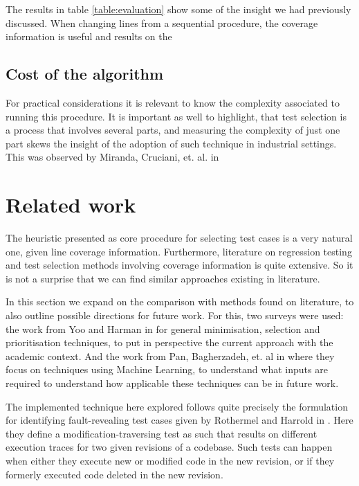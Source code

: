 \documentclass{article}
\begin{document}
The results in table \ref{table:evaluation} show some of the insight we had previously discussed. When changing lines from a sequential procedure, the coverage information is useful and results on the 


\subsection{Cost of the algorithm}
For practical considerations it is relevant to know the complexity associated to running this procedure. It is important as well to highlight, that test selection is a process that involves several parts, and measuring the complexity of just one part skews the insight of the adoption of such technique in industrial settings. This was observed by Miranda, Cruciani, et. al. in \cite{TODO}
\section{Related work}\label{section:alg-and-context}
The heuristic presented as core procedure for selecting test cases is a very natural one, given line coverage information. Furthermore, literature on regression testing and test selection methods involving coverage information is quite extensive. So it is not a surprise that we can find similar approaches existing in literature.

In this section we expand on the comparison with methods found on literature, to also outline possible directions for future work. For this, two surveys were used: the work from Yoo and Harman in \cite{Yoo2009RegressionTM} for general minimisation, selection and prioritisation techniques, to put in perspective the current approach with the academic context. And the work from Pan, Bagherzadeh, et. al in \cite{Pan2021TestCS} where they focus on techniques using Machine Learning, to understand what inputs are required to understand how applicable these techniques can be in future work.

The implemented technique here explored follows quite precisely the formulation for identifying fault-revealing test cases given by Rothermel and Harrold in \cite{TODO}. Here they define a modification-traversing test as such that results on different execution traces for two given revisions of a codebase. Such tests can happen when either they execute new or modified code in the new revision, or if they formerly executed code deleted in the new revision.
\end{document}
